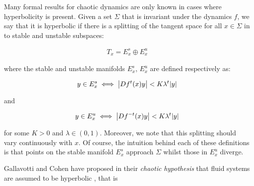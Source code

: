 Many formal results for chaotic dynamics are only known in cases where hyperbolicity is present. Given a set $\Sigma$ that is invariant under the dynamics $f$, we say that it is hyperbolic if there is a splitting of the tangent space for all $x \in \Sigma$ in to stable and unstable subspaces\cite{Ott2002}:

\begin{align}
T_x = E_x^s \oplus E_x^u
\end{align}

\noindent where the stable and unstable manifolds $E_x^s$, $ E_x^u$ are defined respectively as:

\begin{align}
y \in E_x^s \iff \abs{Df^t(x)y} < K \lambda ^t \abs{y}
\end{align}

\noindent and

\begin{align}
y \in E_x^u \iff \abs{Df^{-t} (x)y} < K \lambda ^t \abs{y}
\end{align}

\noindent for some $K > 0$ and $\lambda \in (0, 1)$. Moreover, we note that this splitting should vary continuously with $x$. Of course, the intuition behind each of these definitions is that points on the stable manifold $E_x^s$ approach $\Sigma$ whilst those in $E_x^u$ diverge.  

Gallavotti and Cohen have proposed in their \textit{chaotic hypothesis} that fluid systems are assumed to be hyperbolic \cite{Gallavotti1995a}, that is 
